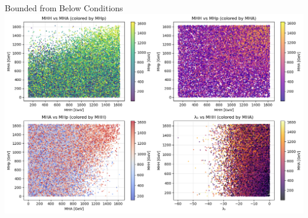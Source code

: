 \documentclass{../bredelebeamer}
\begin{document}
\begin{frame}{Bounded from Below Conditions}
    \includegraphics[width=\textwidth]{stability_lam1_2_3_4_condition_THDM_param_scan_analysis}
\end{frame}
\end{document}
